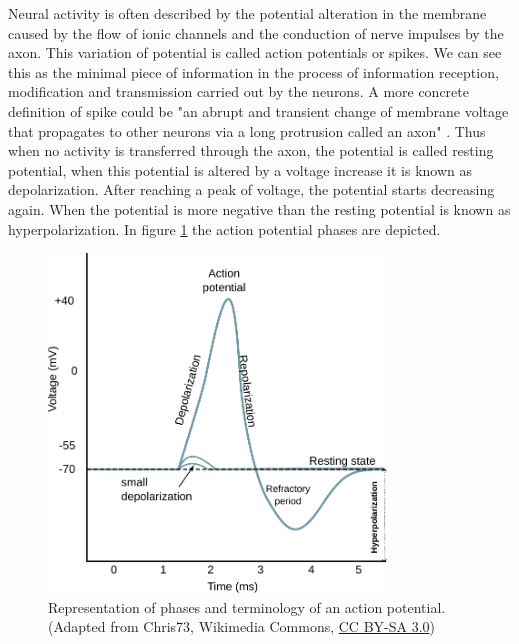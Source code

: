 Neural activity is often described by the potential alteration in the membrane caused by the flow of ionic channels and the conduction of nerve impulses by the axon. This variation of potential is called action potentials or spikes. We can see this as the minimal piece of information in the process of information reception, modification and transmission carried out by the neurons. A more concrete definition of spike could be "an abrupt and transient change of membrane voltage that propagates to other neurons via a long protrusion called an axon" \parencite{izhikevich_dynamical_2007}. Thus when no activity is transferred through the axon, the potential is called resting potential, when this potential is altered by a voltage increase it is known as depolarization. After reaching a peak of voltage, the potential starts decreasing again. When the potential is more negative than the resting potential is known as hyperpolarization. In figure \ref{fig:action potential} the action potential phases are depicted. 

\begin{figure}[htb!]
    \centering
    \includegraphics[width=0.8\textwidth]{img/intro/action_potential.pdf}
    \caption{Representation of phases and terminology of an action potential. (Adapted from Chris73, Wikimedia Commons, \href{https://creativecommons.org/licenses/by-sa/3.0/}{CC BY-SA 3.0})}
    \label{fig:action potential}
\end{figure}

